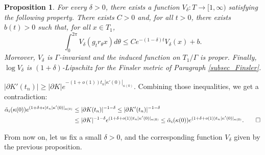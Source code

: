 \documentclass[10pt, pagebackref, a4paper, oneside]{amsart}
\newtheorem{prop}{Proposition}
\begin{document}
\begin{prop}
For every $\delta>0$, there exists a function $V_\delta : T \to
[1,\infty)$ satisfying the following property. There exists $C>0$
and, for all $t>0$, there exists $b(t)>0$ such that, for all $x\in
T_1$,
  \begin{equation}
  \int_0^{2\pi} V_\delta(g_t r_\theta x) d \theta
  \leq C e^{-(1-\delta)t} V_\delta(x) + b.
  \end{equation}
Moreover, $V_\delta$ is $\Gamma$-invariant and the induced function
on $T_1/\Gamma$ is proper. Finally, $\log V_\delta$ is
$(1+\delta)$-Lipschitz for the Finsler metric of Paragraph
\ref{subsec_Finsler}.
\end{prop}


$|\partial K'(t_n)| \geq |\partial K| e^{-(1+o(1))t_n
|\kappa'(0)|_{\kappa(0)}}$. Combining those inequalities, we get a
contradiction:
  \begin{align*}
  \tilde \alpha_i(\kappa(0))e^{(1+\delta+\epsilon)t_n |\kappa'(0)|_{\kappa(0)}}
  &\leq |\partial K(t_n)|^{-1-\delta}
  \leq |\partial K'(t_n)|^{-1-\delta}
  \\&
  \leq |\partial K|^{-1-\delta} e^{(1+\delta+o(1))t_n |\kappa'(0)|_{\kappa(0)}}
  \leq \tilde \alpha_i(\kappa(0)) e^{(1+\delta+o(1))t_n |\kappa'(0)|_{\kappa(0)}}.
  \qedhere
  \end{align*}


From now on, let us fix a small $\delta>0$, and the corresponding
function $V_\delta$ given by the previous proposition.
\end{document}
